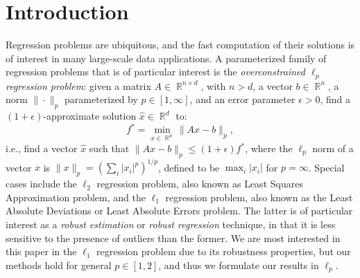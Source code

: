 \documentclass[11pt]{article}
\DeclareMathOperator{\R}{\mathbb{R}}
\begin{document}
\section{Introduction}
\label{sxn:intro}

Regression problems are ubiquitous, and the fast computation of their 
solutions is of interest in many large-scale data applications.
A parameterized family of regression problems that is of particular interest 
is the \emph{overconstrained $\ell_p$ regression problem}: given a matrix 
$A \in \R^{n \times d}$, with $n > d$, a vector $b \in \R^n$, a norm 
$\|\cdot\|_p$ parameterized by $p\in[1,\infty]$, and an error parameter 
$\epsilon > 0$, find a $(1+\epsilon)$-approximate solution 
$\hat{x} \in \R^d$ to:
\begin{equation}
  f^* = \min_{x \in \R^d} \|A x - b\|_p,
\end{equation}
i.e., find a vector $\hat{x}$ such that 
$\|A \hat{x} - b\|_p \leq (1+\epsilon) f^*$, where the $\ell_p$ norm of a
vector $x$ is $ \|x\|_p=\left(\sum_i|x_i|^p\right)^{1/p} $, defined to be
$\max_i |x_i|$ for $p=\infty$.
Special cases include the $\ell_2$ regression problem, also known as Least
Squares Approximation problem, and the $\ell_1$ regression problem, also known
as the Least Absolute Deviations or Least Absolute Errors problem.
The latter is of particular interest as a \emph{robust estimation} or
\emph{robust regression} technique, in that it is less sensitive to the presence
of outliers than the former.
We are most interested in this paper in the $\ell_1$ regression problem due 
to its robustness properties, but our methods hold for general $p\in[1,2]$, 
and thus we formulate our results in $\ell_p$.
\end{document}
